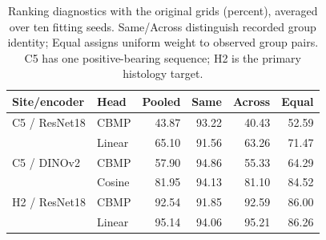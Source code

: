 \begin{table}[!htbp]
\centering\small
\setlength{\tabcolsep}{4pt}
\begin{tabular}{llrrrr}
\hline
Site/encoder & Head & Pooled & Same & Across & Equal \\
\hline
C5 / ResNet18 & CBMP & 43.87 & 93.22 & 40.43 & 52.59 \\
 & Linear & 65.10 & 91.56 & 63.26 & 71.47 \\
C5 / DINOv2 & CBMP & 57.90 & 94.86 & 55.33 & 64.29 \\
 & Cosine & 81.95 & 94.13 & 81.10 & 84.52 \\
H2 / ResNet18 & CBMP & 92.54 & 91.85 & 92.59 & 86.00 \\
 & Linear & 95.14 & 94.06 & 95.21 & 86.26 \\
\hline
\end{tabular}
\caption{Ranking diagnostics with the original grids (percent), averaged over ten fitting seeds. Same/Across distinguish recorded group identity; Equal assigns uniform weight to observed group pairs. C5 has one positive-bearing sequence; H2 is the primary histology target.}
\label{tab:group_ranking}
\end{table}
